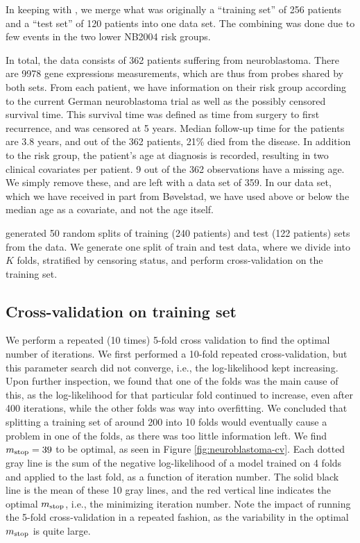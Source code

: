 In keeping with \citet{bovelstad2009}, we merge what was originally a ``training set'' of 256 patients and a ``test set'' of 120 patients into one data set.
The combining was done due to few events in the two lower NB2004 risk groups.

In total, the data consists of 362 patients suffering from neuroblastoma.
There are 9978 gene expressions measurements, which are thus from probes shared by both sets.
From each patient, we have information on their risk group according to the current German neuroblastoma trial as well as the possibly censored survival time.
This survival time was defined as time from surgery to first recurrence, and was censored at 5 years.
Median follow-up time for the patients are 3.8 years, and out of the 362 patients, 21\% died from the disease.
In addition to the risk group, the patient's age at diagnosis is recorded, resulting in two clinical covariates per patient.
9 out of the 362 observations have a missing age.
We simply remove these, and are left with a data set of 359.
In our data set, which we have received in part from Bøvelstad, we have used above or below the median age as a covariate, and not the age itself.

\citet{bovelstad2009} generated 50 random splits of training (240 patients) and test (122 patients) sets from the data.
We generate one split of train and test data, where we divide into $K$ folds, stratified by censoring status, and perform cross-validation on the training set.

\subsection{Cross-validation on training set}
We perform a repeated (10 times) 5-fold cross validation to find the optimal number of iterations.
We first performed a 10-fold repeated cross-validation, but this parameter search did not converge, i.e., the log-likelihood kept increasing.
Upon further inspection, we found that one of the folds was the main cause of this, as the log-likelihood for that particular fold continued to increase, even after 400 iterations, while the other folds was way into overfitting.
We concluded that splitting a training set of around 200 into 10 folds would eventually cause a problem in one of the folds, as there was too little information left.
We find $m_{\text{stop}}=39$ to be optimal, as seen in Figure \ref{fig:neuroblastoma-cv}.
Each dotted gray line is the sum of the negative log-likelihood of a model trained on 4 folds and applied to the last fold, as a function of iteration number.
The solid black line is the mean of these 10 gray lines, and the red vertical line indicates the optimal $m_{\text{stop}}$, i.e., the minimizing iteration number.
Note the impact of running the 5-fold cross-validation in a repeated fashion, as the variability in the optimal $m_{\text{stop}}$ is quite large.

